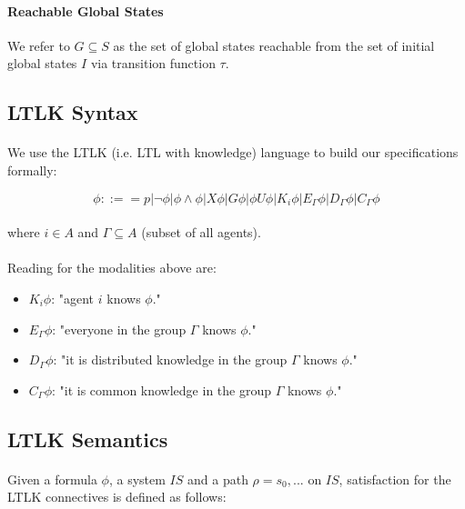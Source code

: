 \documentclass{article}
\theoremstyle{plain}
\theoremstyle{definition}
\begin{document}
\begin{multicols}{2}
\paragraph{Reachable Global States} We refer to $G \subseteq S$ as the set of global states reachable from the set of initial global states $I$ via transition function $\tau$.

\subsection{LTLK Syntax}

\paragraph{} We use the LTLK (i.e. LTL with knowledge) language to build our specifications formally:

$$\phi ::== p | \lnot \phi | \phi \land \phi | X\phi | G\phi | \phi U \phi | K_i\phi | E_\Gamma \phi | D_\Gamma \phi | C_\Gamma \phi$$

\paragraph{} where $i \in A$ and $\Gamma \subseteq A$ (subset of all agents).

\paragraph{} Reading for the modalities above are:

\begin{itemize}
\item $K_i\phi$: "agent $i$ knows $\phi$."
\item $E_\Gamma \phi$: "everyone in the group $\Gamma$ knows $\phi$."
\item $D_\Gamma \phi$: "it is distributed knowledge in the group $\Gamma$ knows $\phi$."
\item $C_\Gamma \phi$: "it is common knowledge in the group $\Gamma$ knows $\phi$."
\end{itemize}

\subsection{LTLK Semantics}

\paragraph{} Given a formula $\phi$, a system $IS$ and a path $\rho = s_0, ...$ on $IS$, satisfaction for the LTLK connectives is defined as follows:


\end{multicols}
\end{document}
